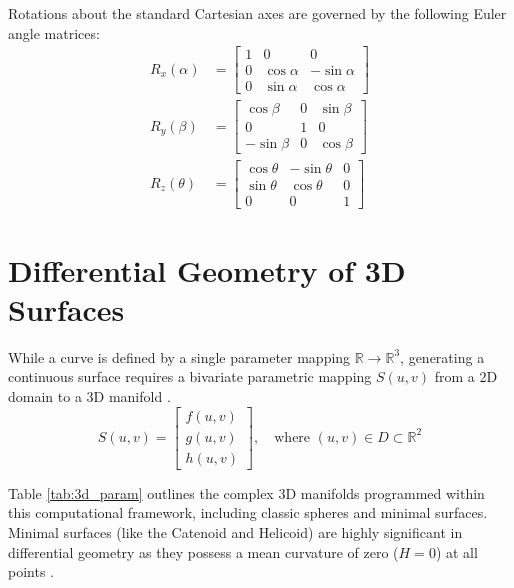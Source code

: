 \documentclass[12pt, a4paper]{report}
\begin{document}
Rotations about the standard Cartesian axes are governed by the following Euler angle matrices:
\begin{align}
    R_x(\alpha) &= \begin{bmatrix} 1 & 0 & 0 \\ 0 & \cos\alpha & -\sin\alpha \\ 0 & \sin\alpha & \cos\alpha \end{bmatrix} \label{eq:rx} \\
    R_y(\beta) &= \begin{bmatrix} \cos\beta & 0 & \sin\beta \\ 0 & 1 & 0 \\ -\sin\beta & 0 & \cos\beta \end{bmatrix} \label{eq:ry} \\
    R_z(\theta) &= \begin{bmatrix} \cos\theta & -\sin\theta & 0 \\ \sin\theta & \cos\theta & 0 \\ 0 & 0 & 1 \end{bmatrix} \label{eq:rz}
\end{align}

\section{Differential Geometry of 3D Surfaces}
While a curve is defined by a single parameter mapping $\mathbb{R} \to \mathbb{R}^3$, generating a continuous surface requires a bivariate parametric mapping $S(u, v)$ from a 2D domain to a 3D manifold \cite{kobayashi2019}.
\begin{equation}
    S(u, v) = \begin{bmatrix} f(u,v) \\ g(u,v) \\ h(u,v) \end{bmatrix}, \quad \text{where } (u,v) \in D \subset \mathbb{R}^2
\end{equation}

Table \ref{tab:3d_param} outlines the complex 3D manifolds programmed within this computational framework, including classic spheres and minimal surfaces. Minimal surfaces (like the Catenoid and Helicoid) are highly significant in differential geometry as they possess a mean curvature of zero ($H=0$) at all points \cite{kobayashi2019}.
\end{document}
